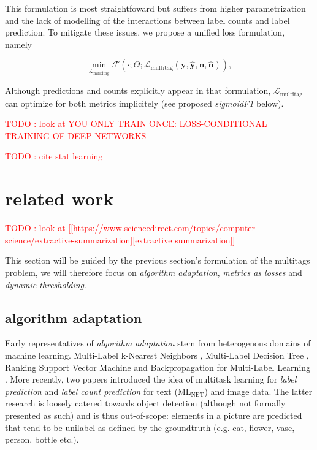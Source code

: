 \documentclass[sigconf,natbib,screen=true,review=true,anonymous]{acmart}
\newcommand\todo[1]{\textcolor{red}{TODO : #1}}
\begin{document}
This formulation is most straightfoward but suffers from higher parametrization and the lack of modelling of the interactions between label counts and label prediction. To mitigate these issues, we propose a unified loss formulation, namely

\begin{equation}
\underset{\mathcal{L}_{\text {multitag}}} {\min} \mathcal{F}\left(\cdot ; \Theta; \mathcal{L}_{\text {multitag}} (\mathbf{y}, \hat{\mathbf{y}}, \mathbf{n}, \hat{\mathbf{n}}) \right),
\end{equation}

Although predictions and counts explicitly appear in that formulation, \(\mathcal{L}_{\text {multitag}}\) can optimize for both metrics implicitely (see proposed \emph{sigmoidF1} below).


\todo{look at YOU ONLY TRAIN ONCE: LOSS-CONDITIONAL TRAINING OF DEEP NETWORKS}

\todo{cite stat learning}   \cite[p. 308-310]{statLearning}




\section{related work}
\label{sec:org3a44ad6}

\todo{look at [[https://www.sciencedirect.com/topics/computer-science/extractive-summarization][extractive summarization]]}

This section will be guided by the previous section's formulation of the multitags problem, we will therefore focus on \emph{algorithm adaptation}, \emph{metrics as losses} and \emph{dynamic thresholding}.

\subsection{algorithm adaptation}
\label{sec:org61d2391}

Early representatives of \emph{algorithm adaptation} stem from heterogenous domains of machine learning. Multi-Label k-Nearest Neighbors \cite{ML-KNN}, Multi-Label Decision Tree \cite{ML-DT}, Ranking Support Vector Machine \cite{multilabelSVM} and Backpropagation for Multi-Label Learning \cite{multilabelBackprop}. More recently, two papers introduced the idea of multitask learning for \emph{label prediction} and \emph{label count prediction} for text (ML\(_{\text{NET}}\)) \cite{multitaskLabel} and image \cite{multitaskLabelImages} data. The latter research is loosely catered towards object detection (although not formally presented as such) and is thus out-of-scope: elements in a picture are predicted that tend to be unilabel as defined by the groundtruth (e.g. cat, flower, vase, person, bottle etc.).
\end{document}
